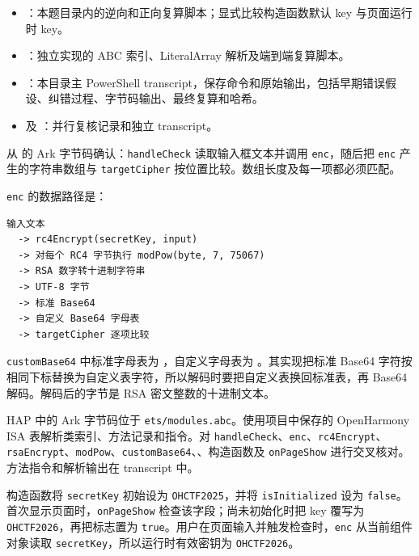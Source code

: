 \begin{itemize}
\tightlist
\item
  \texttt{}：本题目录内的逆向和正向复算脚本；显式比较构造函数默认 key 与页面运行时 key。
\item
  \texttt{}：独立实现的 ABC 索引、LiteralArray 解析及端到端复算脚本。
\item
  \texttt{}：本目录主 PowerShell transcript，保存命令和原始输出，包括早期错误假设、纠错过程、字节码输出、最终复算和哈希。
\item
  \texttt{} 及 \texttt{}：并行复核记录和独立 transcript。
\end{itemize}

从 \texttt{} 的 Ark 字节码确认：\texttt{handleCheck} 读取输入框文本并调用 \texttt{enc}，随后把 \texttt{enc} 产生的字符串数组与 \texttt{targetCipher} 按位置比较。数组长度及每一项都必须匹配。

\texttt{enc} 的数据路径是：

\begin{verbatim}
输入文本
  -> rc4Encrypt(secretKey, input)
  -> 对每个 RC4 字节执行 modPow(byte, 7, 75067)
  -> RSA 数字转十进制字符串
  -> UTF-8 字节
  -> 标准 Base64
  -> 自定义 Base64 字母表
  -> targetCipher 逐项比较
\end{verbatim}

\texttt{customBase64} 中标准字母表为 \texttt{}，自定义字母表为 \texttt{}。其实现把标准 Base64 字符按相同下标替换为自定义表字符，所以解码时要把自定义表换回标准表，再 Base64 解码。解码后的字节是 RSA 密文整数的十进制文本。

HAP 中的 Ark 字节码位于 \texttt{ets/modules.abc}。使用项目中保存的 OpenHarmony ISA 表解析类索引、方法记录和指令。对 \texttt{handleCheck}、\texttt{enc}、\texttt{rc4Encrypt}、\texttt{rsaEncrypt}、\texttt{modPow}、\texttt{customBase64}、\texttt{}、构造函数及 \texttt{onPageShow} 进行交叉核对。方法指令和解析输出在 transcript 中。

构造函数将 \texttt{secretKey} 初始设为 \texttt{OHCTF2025}，并将 \texttt{isInitialized} 设为 \texttt{false}。首次显示页面时，\texttt{onPageShow} 检查该字段；尚未初始化时把 key 覆写为 \texttt{OHCTF2026}，再把标志置为 \texttt{true}。用户在页面输入并触发检查时，\texttt{enc} 从当前组件对象读取 \texttt{secretKey}，所以运行时有效密钥为 \texttt{OHCTF2026}。

